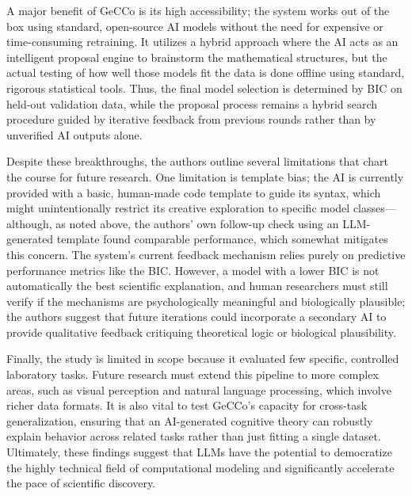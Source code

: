 A major benefit of GeCCo is its high accessibility; the system works out of the box using standard, open-source AI models without the need for expensive or time-consuming retraining. It utilizes a hybrid approach where the AI acts as an intelligent proposal engine to brainstorm the mathematical structures, but the actual testing of how well those models fit the data is done offline using standard, rigorous statistical tools. Thus, the final model selection is determined by BIC on held-out validation data, while the proposal process remains a hybrid search procedure guided by iterative feedback from previous rounds rather than by unverified AI outputs alone. 

Despite these breakthroughs, the authors outline several limitations that chart the course for future research. One limitation is template bias; the AI is currently provided with a basic, human-made code template to guide its syntax, which might unintentionally restrict its creative exploration to specific model classes---although, as noted above, the authors' own follow-up check using an LLM-generated template found comparable performance, which somewhat mitigates this concern. The system's current feedback mechanism relies purely on predictive performance metrics like the BIC. However, a model with a lower BIC is not automatically the best scientific explanation, and human researchers must still verify if the mechanisms are psychologically meaningful and biologically plausible; the authors suggest that future iterations could incorporate a secondary AI to provide qualitative feedback critiquing theoretical logic or biological plausibility. 

Finally, the study is limited in scope because it evaluated few specific, controlled laboratory tasks. Future research must extend this pipeline to more complex areas, such as visual perception and natural language processing, which involve richer data formats. It is also vital to test GeCCo's capacity for cross-task generalization, ensuring that an AI-generated cognitive theory can robustly explain behavior across related tasks rather than just fitting a single dataset. Ultimately, these findings suggest that LLMs have the potential to democratize the highly technical field of computational modeling and significantly accelerate the pace of scientific discovery.

